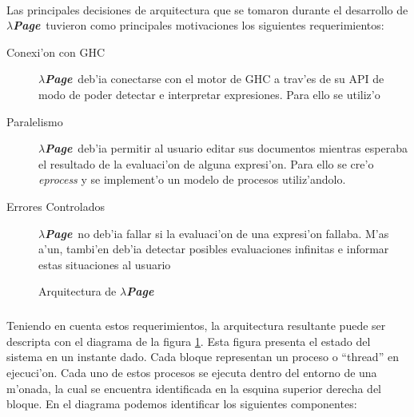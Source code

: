 \documentclass[a4paper]{article}
\newcommand{\hpage}{\textbf{\textsl{$\lambda$Page}}}
\begin{document}
\paragraph{}Las principales decisiones de arquitectura que se tomaron durante el desarrollo de \hpage\ tuvieron como principales motivaciones los siguientes requerimientos:
\begin{description}
\item[Conexi'on con GHC] \hpage\ deb'ia conectarse con el motor de GHC a trav'es de su API de modo de poder detectar e interpretar expresiones.  Para ello se utiliz'o ~\cite{hint}
\item[Paralelismo] \hpage\ deb'ia permitir al usuario editar sus documentos mientras esperaba el resultado de la evaluaci'on de alguna expresi'on.  Para ello se cre'o \textsl{eprocess} y se implement'o un modelo de procesos utiliz'andolo.
\item[Errores Controlados] \hpage\ no deb'ia fallar si la evaluaci'on de una expresi'on fallaba.  M'as a'un, tambi'en deb'ia detectar posibles evaluaciones infinitas e informar estas situaciones al usuario
\end{description}
\begin{figure}[hp]
	\begin{center}
		\caption{Arquitectura de \hpage}
		\label{arq1}
	\end{center}
\end{figure}
\subparagraph{}Teniendo en cuenta estos requerimientos, la arquitectura resultante puede ser descripta con el diagrama de la figura \ref{arq1}.  Esta figura presenta el estado del sistema en un instante dado.  Cada bloque representan un proceso o ``thread'' en ejecuci'on.  Cada uno de estos procesos se ejecuta dentro del entorno de una m'onada, la cual se encuentra identificada en la esquina superior derecha del bloque.  En el diagrama podemos identificar los siguientes componentes:
\end{document}
